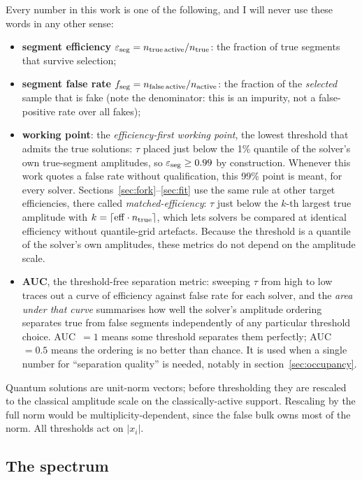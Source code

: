 \documentclass[11pt,a4paper]{article}
\newcommand{\eff}{\ensuremath{\varepsilon_{\rm seg}}}
\newcommand{\far}{\ensuremath{f_{\rm seg}}}
\begin{document}
Every number in this work is one of the following, and I will never use
these words in any other sense:
\begin{itemize}[leftmargin=2em]
\item \textbf{segment efficiency} $\eff=n_{\rm true\,active}/n_{\rm true}$:
the fraction of true segments that survive selection;
\item \textbf{segment false rate}
$\far=n_{\rm false\,active}/n_{\rm active}$: the fraction of the
\emph{selected} sample that is fake (note the denominator: this is an
impurity, not a false-positive rate over all fakes);
\item \textbf{working point}: the \emph{efficiency-first working
point}, the lowest threshold that admits the true solutions: $\tau$
placed just below the 1\% quantile of the solver's own true-segment
amplitudes, so $\eff\ge0.99$ by construction. Whenever this work
quotes a false rate without qualification, this 99\% point is meant,
for every solver. Sections~\ref{sec:fork}--\ref{sec:fit} use the same
rule at other target efficiencies, there called
\emph{matched-efficiency}: $\tau$ just below the $k$-th largest true
amplitude with $k=\lceil\mathrm{eff}\cdot n_{\rm true}\rceil$, which
lets solvers be compared at identical efficiency without quantile-grid
artefacts. Because the threshold is a quantile of the solver's own
amplitudes, these metrics do not depend on the amplitude scale.
\item \textbf{AUC}, the threshold-free separation metric: sweeping
$\tau$ from high to low traces out a curve of efficiency against false
rate for each solver, and the \emph{area under that curve} summarises
how well the solver's amplitude ordering separates true from false
segments independently of any particular threshold choice. AUC~$=1$
means some threshold separates them perfectly; AUC~$=0.5$ means the
ordering is no better than chance. It is used when a single number for
``separation quality'' is needed, notably in
section~\ref{sec:occupancy}.
\end{itemize}
Quantum solutions are unit-norm vectors; before thresholding they are
rescaled to the classical amplitude scale on the classically-active
support. Rescaling by the full norm would be multiplicity-dependent,
since the false bulk owns most of the norm. All thresholds act on
$|x_i|$.

\subsection{The spectrum}
\label{sec:toy:spectrum}
\end{document}
